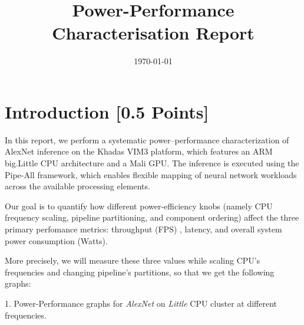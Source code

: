 \documentclass{uva-inf-article}
\title{Power-Performance Characterisation Report}
\date{\today}
\begin{document}
\maketitle





\section{Introduction [0.5 Points]} 


    In this report, we perform a systematic power–performance characterization of AlexNet inference on the Khadas VIM3 platform, which features an ARM big.Little CPU architecture and a Mali GPU. The inference is executed using the Pipe-All framework, which enables flexible mapping of neural network workloads across the available processing elements. 

    Our goal is to quantify how different power-efficiency knobs (namely CPU frequency scaling, pipeline partitioning, and component ordering) affect the three primary perfomance metrics: throughput (FPS) , latency, and overall system power consumption (Watts).

More precisely, we will measure these three values while scaling CPU's frequencies and changing pipeline's partitions, so that we get the following graphs:

1. Power-Performance graphs for {\em AlexNet} on {\em Little} CPU cluster at different frequencies.
\end{document}
